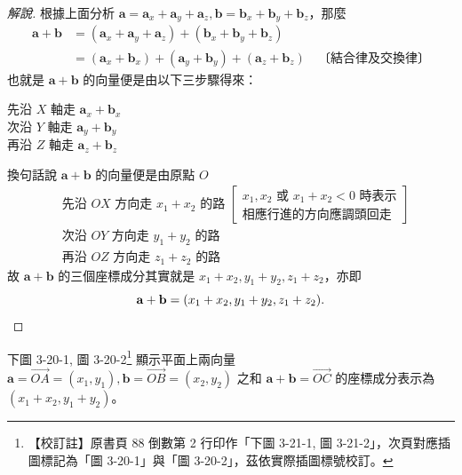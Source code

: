 \begin{proof}[解說]
根據上面分析 $\mathbf{a} = \mathbf{a}_x + \mathbf{a}_y + \mathbf{a}_z, \mathbf{b} = \mathbf{b}_x + \mathbf{b}_y + \mathbf{b}_z$，那麼
\begin{align*}
\mathbf{a} + \mathbf{b} &= (\mathbf{a}_x + \mathbf{a}_y + \mathbf{a}_z) + (\mathbf{b}_x + \mathbf{b}_y + \mathbf{b}_z) \\
&= (\mathbf{a}_x + \mathbf{b}_x) + (\mathbf{a}_y + \mathbf{b}_y) + (\mathbf{a}_z + \mathbf{b}_z) \quad \text{〔結合律及交換律〕}
\end{align*}
也就是 $\mathbf{a} + \mathbf{b}$ 的向量便是由以下三步驟得來：
\begin{center}
先沿 $X$ 軸走 $\mathbf{a}_x + \mathbf{b}_x$\\
次沿 $Y$ 軸走 $\mathbf{a}_y + \mathbf{b}_y$\\
再沿 $Z$ 軸走 $\mathbf{a}_z + \mathbf{b}_z$
\end{center}
換句話說 $\mathbf{a} + \mathbf{b}$ 的向量便是由原點 $O$
\begin{align*}
&\text{先沿 } OX \text{ 方向走 } x_1 + x_2 \text{ 的路 } \left[\begin{array}{l} x_1, x_2 \text{ 或 } x_1 + x_2 < 0 \text{ 時表示}\\ \text{相應行進的方向應調頭回走} \end{array}\right] \\
&\text{次沿 } OY \text{ 方向走 } y_1 + y_2 \text{ 的路} \\
&\text{再沿 } OZ \text{ 方向走 } z_1 + z_2 \text{ 的路}
\end{align*}
故 $\mathbf{a} + \mathbf{b}$ 的三個座標成分其實就是 $x_1 + x_2, y_1 + y_2, z_1 + z_2$，亦即
\[ \mathbf{a} + \mathbf{b} = (x_1 + x_2, y_1 + y_2, z_1 + z_2). \qedhere \]
\end{proof}

\label{note:b3-ch3-p88-fig-ref}%
下圖 3-20-1, 圖 3-20-2\footnote{【校訂註】原書頁 88 倒數第 2 行印作「下圖 3-21-1, 圖 3-21-2」，次頁對應插圖標記為「圖 3-20-1」與「圖 3-20-2」，茲依實際插圖標號校訂。} 顯示平面上兩向量 $\mathbf{a} = \vec{OA} = (x_1, y_1), \mathbf{b} = \vec{OB} = (x_2, y_2)$ 之和 $\mathbf{a} + \mathbf{b} = \vec{OC}$ 的座標成分表示為 $(x_1 + x_2, y_1 + y_2)$。

